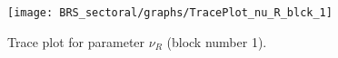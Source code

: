 \begin{figure}[H]
\centering
  \texttt{[image: BRS\_sectoral/graphs/TracePlot\_nu\_R\_blck\_1]}\\
    \caption{Trace plot for parameter ${\nu_R}$ (block number 1).}
\end{figure}
